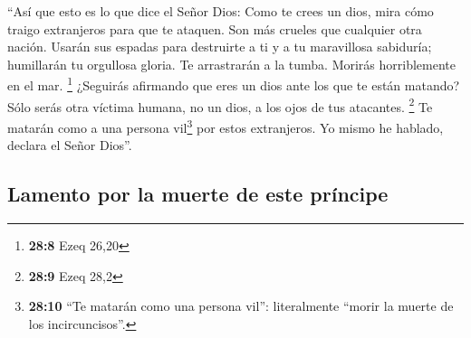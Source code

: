  ``Así que esto es lo que dice el Señor Dios: Como te
crees un dios,  mira cómo traigo extranjeros para que te
ataquen. Son más crueles que cualquier otra nación. Usarán sus espadas
para destruirte a ti y a tu maravillosa sabiduría; humillarán tu
orgullosa gloria.  Te arrastrarán a la tumba. Morirás
horriblemente en el mar. \footnote{\textbf{28:8} Ezeq 26,20}
 ¿Seguirás afirmando que eres un dios ante los que te
están matando? Sólo serás otra víctima humana, no un dios, a los ojos de
tus atacantes. \footnote{\textbf{28:9} Ezeq 28,2}  Te
matarán como a una persona vil\footnote{\textbf{28:10} ``Te matarán como
  una persona vil'': literalmente ``morir la muerte de los
  incircuncisos''.} por estos extranjeros. Yo mismo he hablado, declara
el Señor Dios''.

\hypertarget{lamento-por-la-muerte-de-este-pruxedncipe}{%
\subsection{Lamento por la muerte de este
príncipe}\label{lamento-por-la-muerte-de-este-pruxedncipe}}

